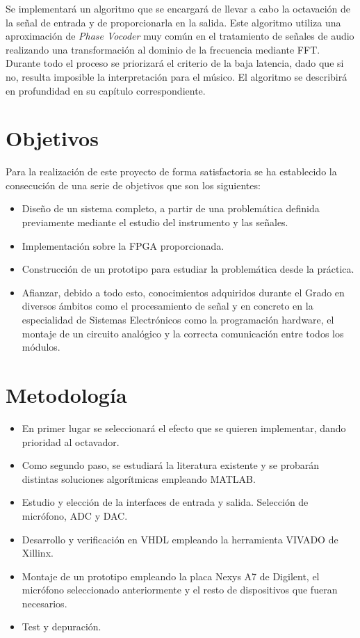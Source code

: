 Se implementará un algoritmo que se encargará de llevar a cabo la octavación de la señal de entrada y de proporcionarla en la salida. Este algoritmo utiliza una aproximación de \emph{Phase Vocoder} muy común en el tratamiento de señales de audio realizando una transformación al dominio de la frecuencia mediante FFT. Durante todo el proceso se priorizará el criterio de la baja latencia, dado que si no, resulta imposible la interpretación para el músico. El algoritmo se describirá en profundidad en su capítulo correspondiente.

\section{Objetivos}
Para la realización de este proyecto de forma satisfactoria se ha establecido la consecución de una serie de objetivos que son los siguientes:
\begin{itemize}
\item Diseño de un sistema completo, a partir de una problemática definida previamente mediante el estudio del instrumento y las señales.
\item Implementación sobre la FPGA proporcionada.
\item Construcción de un prototipo para estudiar la problemática desde la práctica.
\item Afianzar, debido a todo esto, conocimientos adquiridos durante el Grado en diversos ámbitos como el procesamiento de señal y en concreto en la especialidad de Sistemas Electrónicos como la programación hardware, el montaje de un circuito analógico y la correcta comunicación entre todos los módulos.
\end{itemize}

\section{Metodología}
\begin{itemize}
\item En primer lugar se seleccionará el efecto que se quieren implementar, dando prioridad al octavador.
\item Como segundo paso, se estudiará la literatura existente y se probarán distintas soluciones algorítmicas empleando MATLAB.
\item Estudio y elección de la interfaces de entrada y salida. Selección de micrófono, ADC y DAC.
\item Desarrollo y verificación en VHDL empleando la herramienta VIVADO de Xillinx.
\item Montaje de un prototipo empleando la placa Nexys A7 de Digilent, el micrófono seleccionado anteriormente y el resto de dispositivos que fueran necesarios.
\item Test y depuración.
\end{itemize}

